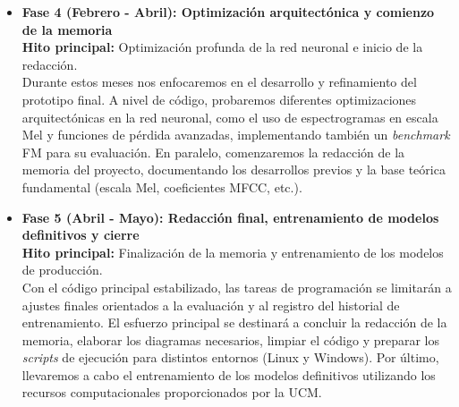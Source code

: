 \begin{itemize}
    \item \textbf{Fase 4 (Febrero - Abril): Optimización arquitectónica y comienzo de la memoria} \\
    \textbf{Hito principal:} Optimización profunda de la red neuronal e inicio de la redacción. \\
    Durante estos meses nos enfocaremos en el desarrollo y refinamiento del prototipo final. A nivel de código, probaremos diferentes optimizaciones arquitectónicas en la red neuronal, como el uso de espectrogramas en escala Mel y funciones de pérdida avanzadas, implementando también un \textit{benchmark} FM para su evaluación. En paralelo, comenzaremos la redacción de la memoria del proyecto, documentando los desarrollos previos y la base teórica fundamental (escala Mel, coeficientes MFCC, etc.).

    \item \textbf{Fase 5 (Abril - Mayo): Redacción final, entrenamiento de modelos definitivos y cierre} \\
    \textbf{Hito principal:} Finalización de la memoria y entrenamiento de los modelos de producción. \\
    Con el código principal estabilizado, las tareas de programación se limitarán a ajustes finales orientados a la evaluación y al registro del historial de entrenamiento. El esfuerzo principal se destinará a concluir la redacción de la memoria, elaborar los diagramas necesarios, limpiar el código y preparar los \textit{scripts} de ejecución para distintos entornos (Linux y Windows). Por último, llevaremos a cabo el entrenamiento de los modelos definitivos utilizando los recursos computacionales proporcionados por la UCM.
\end{itemize}

